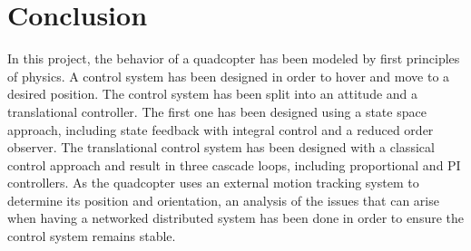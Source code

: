 \section{Conclusion}
In this project, the behavior of a quadcopter has been modeled by first principles of physics. A control system has been designed in order to hover and move to a desired position.
The control system has been split into an attitude and a translational controller. The first one has been designed using a state space approach, including state feedback with integral control and a reduced order observer. The translational control system has been designed with a classical control approach and result in three cascade loops, including proportional and PI controllers. 
As the quadcopter uses an external motion tracking system to determine its position and orientation, an analysis of the issues that can arise when having a networked distributed system has been done in order to ensure the control system remains stable.